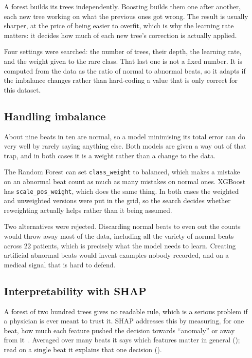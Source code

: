 \documentclass[a4paper, 12pt]{article}
\begin{document}
A forest builds its trees independently. Boosting builds them one after another,
each new tree working on what the previous ones got wrong. The result is usually
sharper, at the price of being easier to overfit, which is why the learning rate
matters: it decides how much of each new tree's correction is actually applied.

Four settings were searched: the number of trees, their depth, the learning rate,
and the weight given to the rare class. That last one is not a fixed number. It is
computed from the data as the ratio of normal to abnormal beats, so it adapts if
the imbalance changes rather than hard-coding a value that is only correct for
this dataset.

\subsection{Handling imbalance} \label{subsec:imbalance-handling}

About nine beats in ten are normal, so a model minimising its total error can do
very well by rarely saying anything else. Both models are given a way out of that
trap, and in both cases it is a weight rather than a change to the data.

The Random Forest can set \texttt{class\_weight} to balanced, which makes a
mistake on an abnormal beat count as much as many mistakes on normal ones. XGBoost
has \texttt{scale\_pos\_weight}, which does the same thing. In both cases the
weighted and unweighted versions were put in the grid, so the search decides
whether reweighting actually helps rather than it being assumed.

Two alternatives were rejected. Discarding normal beats to even out the counts
would throw away most of the data, including all the variety of normal beats
across 22 patients, which is precisely what the model needs to learn. Creating
artificial abnormal beats would invent examples nobody recorded, and on a medical
signal that is hard to defend.

\subsection{Interpretability with SHAP} \label{subsec:shap}

A forest of two hundred trees gives no readable rule, which is a serious problem
if a physician is ever meant to trust it. SHAP addresses this by measuring, for
one beat, how much each feature pushed the decision towards ``anomaly'' or away
from it~\cite{lundberg2017shap}. Averaged over many beats it says which features
matter in general (); read on a single beat it explains that one
decision ().
\end{document}
